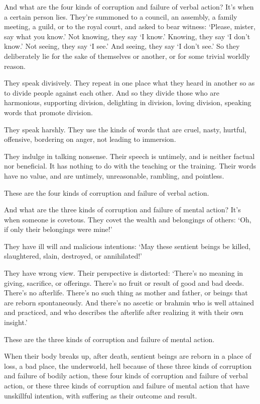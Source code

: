 \documentclass[12pt,openany]{book}%
\begin{document}
And what are the four kinds of corruption and failure of verbal action? It’s when a certain person lies. They’re summoned to a council, an assembly, a family meeting, a guild, or to the royal court, and asked to bear witness: ‘Please, mister, say what you know.’ Not knowing, they say ‘I know.’ Knowing, they say ‘I don’t know.’ Not seeing, they say ‘I see.’ And seeing, they say ‘I don’t see.’ So they deliberately lie for the sake of themselves or another, or for some trivial worldly reason. 

They speak divisively. They repeat in one place what they heard in another so as to divide people against each other. And so they divide those who are harmonious, supporting division, delighting in division, loving division, speaking words that promote division. 

They speak harshly. They use the kinds of words that are cruel, nasty, hurtful, offensive, bordering on anger, not leading to immersion. 

They indulge in talking nonsense. Their speech is untimely, and is neither factual nor beneficial. It has nothing to do with the teaching or the training. Their words have no value, and are untimely, unreasonable, rambling, and pointless. 

These are the four kinds of corruption and failure of verbal action. 

And what are the three kinds of corruption and failure of mental action? It’s when someone is covetous. They covet the wealth and belongings of others: ‘Oh, if only their belongings were mine!’ 

They have ill will and malicious intentions: ‘May these sentient beings be killed, slaughtered, slain, destroyed, or annihilated!’ 

They have wrong view. Their perspective is distorted: ‘There’s no meaning in giving, sacrifice, or offerings. There’s no fruit or result of good and bad deeds. There’s no afterlife. There’s no such thing as mother and father, or beings that are reborn spontaneously. And there’s no ascetic or brahmin who is well attained and practiced, and who describes the afterlife after realizing it with their own insight.’ 

These are the three kinds of corruption and failure of mental action. 

When their body breaks up, after death, sentient beings are reborn in a place of loss, a bad place, the underworld, hell because of these three kinds of corruption and failure of bodily action, these four kinds of corruption and failure of verbal action, or these three kinds of corruption and failure of mental action that have unskillful intention, with suffering as their outcome and result. 
\end{document}
